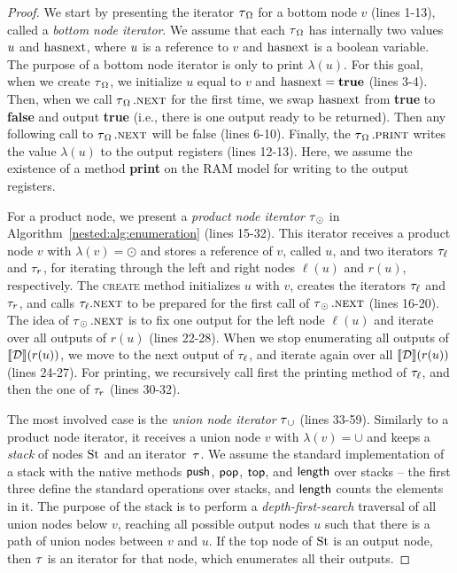 \begin{proof}
We start by presenting the iterator $\operatorname{\tau}_\Omega$ for a bottom node $v$ (lines 1-13), called a \emph{bottom node iterator}. We assume that each $\operatorname{\tau}_\Omega$ has internally two values $u$ and $\operatorname{hasnext}$, where $u$ is a reference to $v$ and $\operatorname{hasnext}$ is a boolean variable. The purpose of a bottom node iterator is only to print $\lambda(u)$. For this goal, when we create $\operatorname{\tau}_\Omega$, we initialize $u$ equal to $v$ and $\operatorname{hasnext} = {\bf true}$ (lines 3-4). Then, when we call $\operatorname{\tau}_\Omega.\textsc{next}$ for the first time, we swap $\operatorname{hasnext}$ from {\bf true} to {\bf false} and output {\bf true} (i.e., there is one output ready to be returned). Then any following call to $\operatorname{\tau}_\Omega.\textsc{next}$ will be false (lines 6-10). Finally, the $\operatorname{\tau}_\Omega.\textsc{print}$ writes the value $\lambda(u)$ to the output registers (lines 12-13). Here, we assume the existence of a method {\bf print} on the RAM model for writing to the output registers. 

For a product node, we present a \emph{product node iterator} $\operatorname{\tau}_\odot$ in Algorithm~\ref{nested:alg:enumeration} (lines 15-32). This iterator receives a product node $v$ with $\lambda(v) = \odot$ and stores a reference of $v$, called $u$, and two iterators $\tau_{\ell}$ and $\tau_{r}$, for iterating through the left and right nodes $\ell(u)$ and $r(u)$, respectively. 
The \textsc{create} method initializes $u$ with $v$, creates the iterators $\tau_{\ell}$ and $\tau_{r}$, and calls $\tau_{\ell}.\textsc{next}$ to be prepared for the first call of $\operatorname{\tau}_\odot.\textsc{next}$ (lines 16-20).
The idea of $\operatorname{\tau}_\odot.\textsc{next}$ is to fix one output for the left node $\ell(u)$ and iterate over all outputs of $r(u)$ (lines 22-28). When we stop enumerating all outputs of ${\llbracket{\mathcal{D}}\rrbracket}(r(u))$, we move to the next output of $\tau_{\ell}$, and iterate again over all ${\llbracket{\mathcal{D}}\rrbracket}(r(u))$ (lines 24-27).
For printing, we recursively call first the printing method of $\tau_{\ell}$, and then the one of $\tau_{r}$ (lines 30-32).

The most involved case is the \emph{union node iterator} $\operatorname{\tau}_\cup$ (lines 33-59). Similarly to a product node iterator, it receives a union node $v$ with $\lambda(v) = \cup$ and keeps a \emph{stack} of nodes $\operatorname{St}$ and an iterator~$\operatorname{\tau}$. We assume the standard implementation of a stack with the native methods $\text{\sf push}$, $\text{\sf pop}$, $\text{\sf top}$, and $\text{\sf length}$ over stacks -- the first three define the standard operations over stacks, and $\text{\sf length}$ counts the elements in it. 
The purpose of the stack is to perform a \emph{depth-first-search} traversal of all union nodes below $v$, reaching all possible output nodes $u$ such that there is a path of union nodes between $v$ and $u$. If the top node of $\operatorname{St}$ is an output node, then $\operatorname{\tau}$ is an iterator for that node, which enumerates all their outputs.  


\end{proof}

